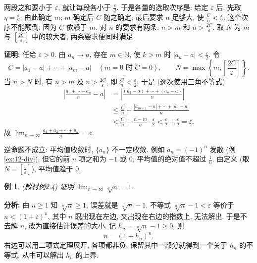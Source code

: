 \documentclass[UTF8,openany]{ctexbook}
\theoremstyle{chinesetextbook}
\newtheorem{example}{例}[section]
\newenvironment{cnproof}{\par\indent\textbf{证明:} \ignorespaces}{\par}
\begin{document}
两段之和要小于 $\varepsilon$, 就让每段各小于 $\displaystyle\frac\varepsilon2$. 于是各量的选取次序是: 给定 $\varepsilon$ 后, 先取 $\displaystyle\eta=\frac\varepsilon2$, 由此确定 $m$; $m$ 确定后 $C$ 随之确定; 最后要求 $n$ 足够大, 使 $\displaystyle\frac Cn<\frac\varepsilon2$. 这个次序不能颠倒, 因为 $C$ 依赖于 $m$. 对 $n$ 的要求有两条: $n>m$ 和 $\displaystyle n>\frac{2C}\varepsilon$. 取 $N$ 为 $m$ 与 $\displaystyle\left[\frac{2C}\varepsilon\right]$ 中的较大者, 两条要求便同时满足.
\begin{cnproof}
任给 $\varepsilon>0$. 由 $a_n\to a$, 存在 $m\in\mathbb N$, 使 $k>m$ 时 $\displaystyle|a_k-a|<\frac\varepsilon2$. 令
\[
C=|a_1-a|+\cdots+|a_m-a|\quad(m=0\text{ 时 }C=0),\qquad N=\max\left\{m,\left[\frac{2C}\varepsilon\right]\right\}.
\]
当 $n>N$ 时, 有 $n>m$ 及 $\displaystyle n>\frac{2C}\varepsilon$, 即 $\displaystyle\frac Cn<\frac\varepsilon2$, 于是 (逐次使用三角不等式)
\[
\begin{aligned}
\left|\frac{a_1+\cdots+a_n}n-a\right|
&=\left|\frac{(a_1-a)+\cdots+(a_n-a)}n\right|\\
&\le\frac Cn+\frac{|a_{m+1}-a|+\cdots+|a_n-a|}n\\
&<\frac Cn+\frac{n-m}n\cdot\frac\varepsilon2
<\frac\varepsilon2+\frac\varepsilon2=\varepsilon.
\end{aligned}
\]
故 $\displaystyle\lim_{n\to\infty}\frac{a_1+a_2+\cdots+a_n}n=a$.
\end{cnproof}
逆命题不成立: 平均值收敛时, $\{a_n\}$ 不一定收敛. 例如 $a_n=(-1)^n$ 发散 (例\ref{ex:12-div}), 但它的前 $n$ 项之和为 $-1$ 或 $0$, 平均值的绝对值不超过 $\displaystyle\frac1n$. 由定义 (取 $\displaystyle N=\left[\frac1\varepsilon\right]$), 平均值趋于 $0$.
\begin{example}\label{ex:2-4}
\textnormal{(教材例2.4)} 证明 $\displaystyle\lim_{n\to\infty}\sqrt[n]n=1$.
\end{example}
\par\indent\textbf{分析:} 由 $n\ge1$ 知 $\sqrt[n]n\ge1$, 误差就是 $\sqrt[n]n-1$. 不等式 $\sqrt[n]n-1<\varepsilon$ 等价于 $n<(1+\varepsilon)^n$, 其中 $n$ 既出现在左边, 又出现在右边的指数上, 无法解出. 于是不去解 $n$, 改为直接估计误差的大小. 记 $h_n=\sqrt[n]n-1\ge0$, 则
\[
n=(1+h_n)^n.
\]
右边可以用二项式定理展开, 各项都非负, 保留其中一部分就得到一个关于 $h_n$ 的不等式, 从中可以解出 $h_n$ 的上界.
\end{document}
